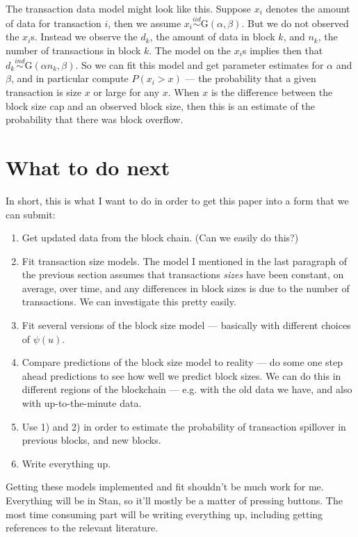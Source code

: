 \documentclass[12pt]{article}
\begin{document}
The transaction data model might look like this. Suppose $x_i$ denotes the amount of data for transaction $i$, then we assume $x_i \stackrel{iid}{\sim}\mathrm{G}(\alpha, \beta)$. But we do not observed the $x_i$s. Instead we observe the $d_k$, the amount of data in block $k$, and $n_k$, the number of transactions in block $k$. The model on the $x_i$s implies then that $d_k \stackrel{ind}{\sim} \mathrm{G}(\alpha n_k, \beta)$. So we can fit this model and get parameter estimates for $\alpha$ and $\beta$, and in particular compute $P(x_i > x)$ --- the probability that a given transaction is size $x$ or large for any $x$. When $x$ is the difference between the block size cap and an observed block size, then this is an estimate of the probability that there was block overflow. 

\section{What to do next}
In short, this is what I want to do in order to get this paper into a form that we can submit:
\begin{enumerate}
\item Get updated data from the block chain. (Can we easily do this?)
\item Fit transaction size models. The model I mentioned in the last paragraph of the previous section assumes that transactions {\it sizes} have been constant, on average, over time, and any differences in block sizes is due to the number of transactions. We can investigate this pretty easily.
\item Fit several versions of the block size model --- basically with different choices of $\psi(u)$. 
\item Compare predictions of the block size model to reality --- do some one step ahead predictions to see how well we predict block sizes. We can do this in different regions of the blockchain --- e.g. with the old data we have, and also with up-to-the-minute data. 
\item Use 1) and 2) in order to estimate the probability of transaction spillover in previous blocks, and new blocks. 
\item Write everything up.
\end{enumerate}

Getting these models implemented and fit shouldn't be much work for me. Everything will be in Stan, so it'll mostly be a matter of pressing buttons. The most time consuming part will be writing everything up, including getting references to the relevant literature.
\end{document}
